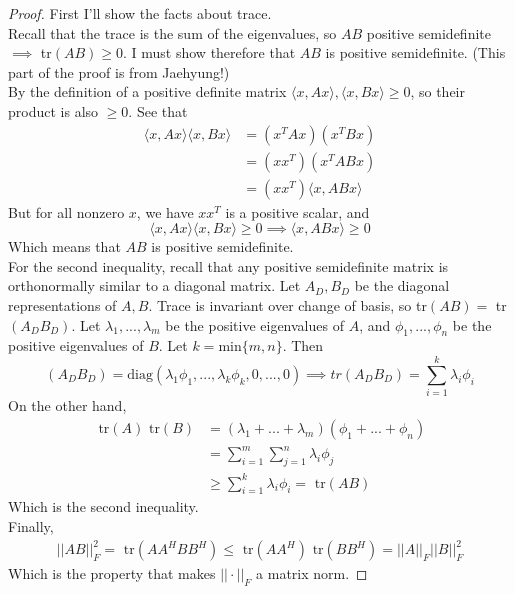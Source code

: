\documentclass[12pt]{article}
\newenvironment{problem}[2][Problem]{\begin{trivlist}
\item[\hskip \labelsep {\bfseries #1}\hskip \labelsep {\bfseries #2.}]}{\end{trivlist}}
\theoremstyle{definition}
\theoremstyle{definition}
\theoremstyle{definition}
\theoremstyle{definition}
\begin{document}
\begin{problem}{4.28}
\begin{proof}
First I'll show the facts about trace. \\ Recall that the trace is the sum of the eigenvalues, so $AB$ positive semidefinite $\implies$ tr$(AB) \geq 0$. I must show therefore that $AB$ is positive semidefinite. (This part of the proof is from Jaehyung!)\\
By the definition of a positive definite matrix $\langle x, Ax \rangle, \langle x, Bx\rangle \geq 0$, so their product is also $ \geq 0$. See that
\begin{align*}
\langle x, Ax \rangle \langle x, Bx \rangle &= (x^TAx)(x^TBx) \\
&= (xx^T)(x^TABx) \\
&= (xx^T) \langle x, ABx \rangle
\end{align*}
But for all nonzero $x$, we have $xx^T$ is a positive scalar, and
$$ \langle x, Ax \rangle \langle x, Bx \rangle \geq 0 \implies \langle x, ABx \rangle \geq 0 $$
Which means that $AB$ is positive semidefinite. \\ 
For the second inequality, recall that any positive semidefinite matrix is orthonormally similar to a diagonal matrix. Let $A_D, B_D$ be the diagonal representations of $A, B$. Trace is invariant over change of basis, so tr$(AB) = $ tr$(A_DB_D)$. Let $\lambda_1, ..., \lambda_m$ be the positive eigenvalues of $A$, and $\phi_1, ..., \phi_n$ be the positive eigenvalues of $B$. Let $k = \text{min}\{m, n\}$. Then $$(A_DB_D) = \text{diag}(\lambda_1\phi_1, ..., \lambda_k\phi_k, 0 ,..., 0) \implies tr(A_DB_D) = \sum_{i=1}^k \lambda_i\phi_i $$
On the other hand, 
\begin{align*}
\text{ tr}(A)\text{ tr}(B) &= (\lambda_1 + ... + \lambda_m)(\phi_1 + ... + \phi_n) \\
&= \sum_{i=1}^{m} \sum_{j=1}^n \lambda_i \phi_j \\
&\geq \sum_{i=1}^k \lambda_i\phi_i = \text{ tr}(AB)
\end{align*} 
Which is the second inequality. \\
Finally, 
\begin{align*}
||AB||_F^2 = \text{ tr}(AA^HBB^H) \leq \text{ tr}(AA^H) \text{ tr}(BB^H) = ||A||_F ||B||_F^2 
\end{align*}
Which is the property that makes $|| \cdot ||_F$ a matrix norm.
\end{proof}
\end{problem}
\end{document}
